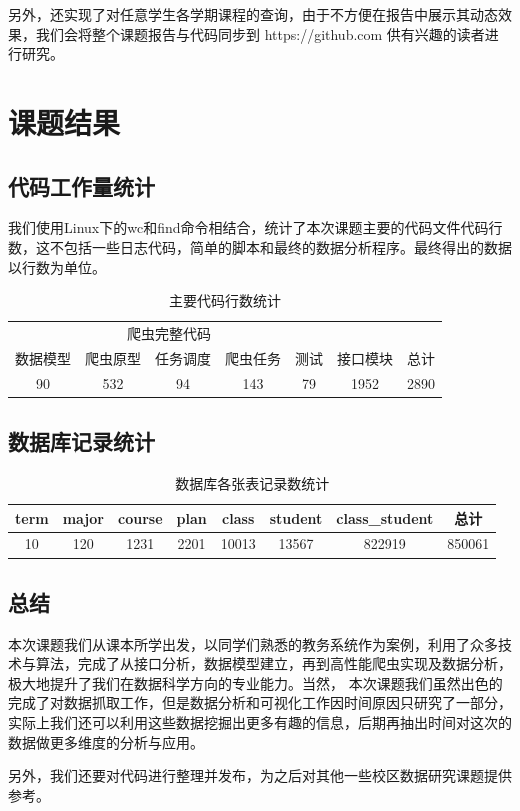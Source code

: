 \documentclass[UTF8, zihao=-4, heading=false]{ctexart}
\begin{document}
    另外，还实现了对任意学生各学期课程的查询，由于不方便在报告中展示其动态效果，我们会将整个课题报告与代码同步到 https://github.com 供有兴趣的读者进行研究。
    
    \section{课题结果}
    \subsection{代码工作量统计}
    
    我们使用Linux下的wc和find命令相结合，统计了本次课题主要的代码文件代码行数，这不包括一些日志代码，简单的脚本和最终的数据分析程序。最终得出的数据以行数为单位。
    
    \begin{table}[htbp]
        \centering
        \caption{主要代码行数统计}
        \begin{tabular}{ccccccc}
            \toprule
            \multicolumn{5}{c}{爬虫完整代码} \\
            \cmidrule{1-5}
            数据模型 & 爬虫原型 & 任务调度 & 爬虫任务 & 测试 & 接口模块 & 总计 \\
            \midrule
            90      & 532      & 94      & 143      & 79  & 1952     & 2890  \\
            \bottomrule
        \end{tabular}
    \end{table}
    
    \subsection{数据库记录统计}
    
    \begin{table}[htbp]
        \centering
        \caption{数据库各张表记录数统计}
        \begin{tabular}{cccccccc}
            \toprule
            term & major & course & plan & class & student & class\_student & 总计  \\
            \midrule
            10   & 120   & 1231   & 2201 & 10013 & 13567   & 822919        & 850061 \\
            \bottomrule
        \end{tabular}
    \end{table}
    
    \subsection{总结}
    本次课题我们从课本所学出发，以同学们熟悉的教务系统作为案例，利用了众多技术与算法，完成了从接口分析，数据模型建立，再到高性能爬虫实现及数据分析，极大地提升了我们在数据科学方向的专业能力。当然，
    本次课题我们虽然出色的完成了对数据抓取工作，但是数据分析和可视化工作因时间原因只研究了一部分，实际上我们还可以利用这些数据挖掘出更多有趣的信息，后期再抽出时间对这次的数据做更多维度的分析与应用。\par
    另外，我们还要对代码进行整理并发布，为之后对其他一些校区数据研究课题提供参考。
    
\end{document}
